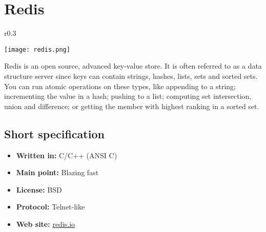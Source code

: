 \chapter{Redis}

\begin{wrapfigure}{r}{0.3\textwidth}
  \vspace{-42pt}
  \begin{center}
    \texttt{[image: redis.png]}
  \end{center}
  \vspace{-20pt}
\end{wrapfigure}
Redis is an open source, advanced key-value store. It is often referred to as a data structure server since keys can contain strings, hashes, lists, sets and sorted sets.
You can run atomic operations on these types, like appending to a string; incrementing the value in a hash; pushing to a list; computing set intersection, union and difference; or getting the member with highest ranking in a sorted set.

\section{Short specification}

\begin{itemize}
  \item \textbf{Written in:} C/C++ (ANSI C)
  \item \textbf{Main point:} Blazing fast
  \item \textbf{License:} BSD
  \item \textbf{Protocol:} Telnet-like
  \item \textbf{Web site:} \href{http://redis.io}{redis.io}
\end{itemize}